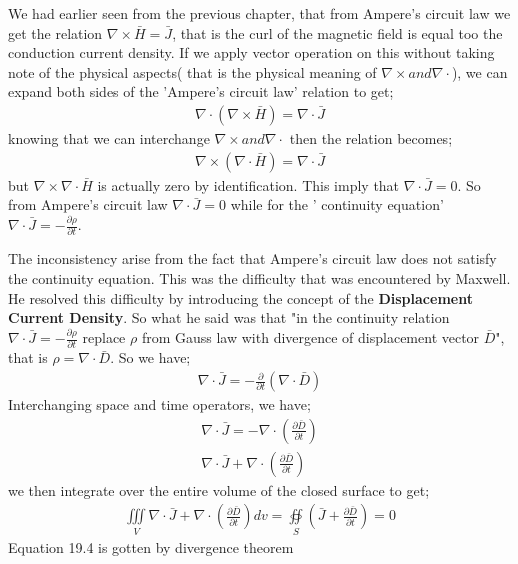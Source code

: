 We had earlier seen from the previous chapter, that from Ampere's circuit law we get the relation $\nabla\times\bar{H}=\bar{J}$, that is the curl of the magnetic field is equal too the conduction current density. If we apply vector operation on this without taking note of the physical aspects( that is the physical meaning of $\nabla\times and  \nabla\cdot$), we can expand both sides of the 'Ampere's circuit law' relation to get;
\begin{align}
\nabla\cdot(\nabla\times\bar{H})=\nabla\cdot\bar{J}
\end{align}
knowing that we can interchange $\nabla\times and  \nabla\cdot$ then the relation becomes;
\begin{align}
\nabla\times(\nabla\cdot\bar{H})=\nabla\cdot\bar{J}
\end{align}
but $\nabla\times\nabla\cdot\bar{H}$ is actually zero by identification. This imply that $\nabla\cdot\bar{J}=0$. So from Ampere's circuit law $\nabla\cdot\bar{J}=0$ while for the ' continuity equation'  $\nabla\cdot\bar{J}=-\frac{\partial\rho}{\partial t}$.

The inconsistency arise from the fact that Ampere's circuit law does not satisfy the continuity equation. This was the difficulty that was encountered by Maxwell. He resolved this difficulty  by introducing the concept of the \textbf{Displacement Current Density}. So what he said was that "in the continuity relation $\nabla\cdot\bar{J}=-\frac{\partial\rho}{\partial t}$ replace $\rho$ from Gauss law with divergence of displacement vector $\bar{D}$", that is $\rho=\nabla\cdot\bar{D}$. So we have;
\begin{align}
\nabla\cdot\bar{J}=-\frac{\partial}{\partial t}(\nabla\cdot\bar{D})
\end{align}
Interchanging space and time operators, we have;
\begin{align}
\nabla\cdot\bar{J}=-\nabla\cdot(\frac{\partial\bar{D}}{\partial t})\\
\nabla\cdot\bar{J}+\nabla\cdot(\frac{\partial\bar{D}}{\partial t})
\end{align}
we then integrate over the entire volume of the closed surface to get;
\begin{align}
\iiint\limits_V\nabla\cdot\bar{J}+\nabla\cdot(\frac{\partial\bar{D}}{\partial t})dv=
\oiint\limits_S(\bar{J}+\frac{\partial\bar{D}}{\partial t})=0
\end{align}
Equation 19.4 is gotten by divergence theorem


